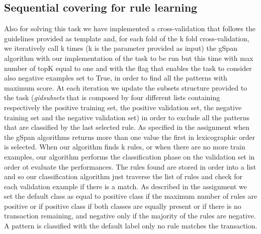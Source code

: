 \documentclass[11pt, a4paper]{article}
\begin{document}
		\subsection{Sequential covering for rule learning}
			Also for solving this task we have implemented a cross-validation that follows the guidelines provided as template and, for each fold of the k fold cross-validation, we iteratively call k times (k is the parameter provided as input) the gSpan algorithm with our implementation of the task to be run but this time with max number of topK equal to one and with the flag that enables the task to consider also negative examples set to True, in order to find all the patterns with maximum score. At each iteration we update the subsets structure provided to the task (\textit{\textit{gid\textunderscore subsets}} that is composed by four different lists containing respectively the positive training set, the positive validation set, the negative training set and the negative validation set) in order to exclude all the patterns that are classified by the last selected rule. As specified in the assignment when the gSpan algorithms returns more than one value the first in lexicographic order is selected.
			When our algorithm finds k rules, or when there are no more train examples, our algorithm performs the classification phase on the validation set in order ot evaluate the performances. The rules found are stored in order into a list and so our classification algorithm just traverse the list of rules and check for each validation example if there is a match. \newline As described in the assignment we set the default class as equal to positive class if the maximum number of rules are positive or if positive class if both classes are equally present or if there is no transaction remaining, and negative only if the majority of the rules are negative. A pattern is classified with the default label only no rule matches the transaction.
\end{document}
